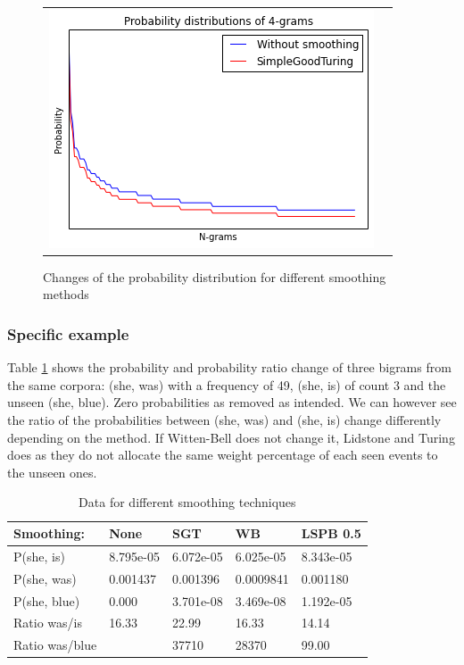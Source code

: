 \documentclass[a4paper,12pt]{article}
\begin{document}
\begin{figure}
\begin{tabular}{cc}
		\includegraphics[width=0.52\linewidth]{4_Turing} \\
	\end{tabular}
	\caption{Changes of the probability distribution for different smoothing methods}
\end{figure}

\subsubsection{Specific example}
	Table \ref{tab:smoothingprobs} shows the probability and probability ratio change of three bigrams from the same corpora: (she, was) with a frequency of 49, (she, is) of count 3 and the unseen (she, blue). Zero probabilities as removed as intended. We can however see the ratio of the probabilities between (she, was) and (she, is) change differently depending on the method. If Witten-Bell does not change it, Lidstone and Turing does as they do not allocate the same weight percentage of each seen events to the unseen ones.


\begin{table}[!h]
\small
\centering
\caption{Data for different smoothing techniques}
\label{tab:smoothingprobs}
\begin{tabular}{@{}lllll@{}}
\toprule
Smoothing:     & None      & SGT       & WB        & LSPB 0.5   \\ \midrule
P(she, is)     & 8.795e-05 & 6.072e-05 & 6.025e-05 & 8.343e-05  \\
P(she, was)    & 0.001437  & 0.001396  & 0.0009841 & 0.001180   \\
P(she, blue)   & 0.000     & 3.701e-08 & 3.469e-08 & 1.192e-05  \\
Ratio was/is   & 16.33     & 22.99     & 16.33     & 14.14      \\
Ratio was/blue &           & 37710     & 28370     & 99.00      \\ \bottomrule
\end{tabular}
\end{table}
\end{document}
